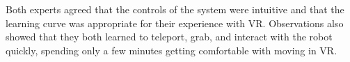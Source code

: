 Both experts agreed that the controls of the system were intuitive and that the learning curve was appropriate for their experience with VR. Observations also showed that they both learned to teleport, grab, and interact with the robot quickly, spending only a few minutes getting comfortable with moving in VR.


